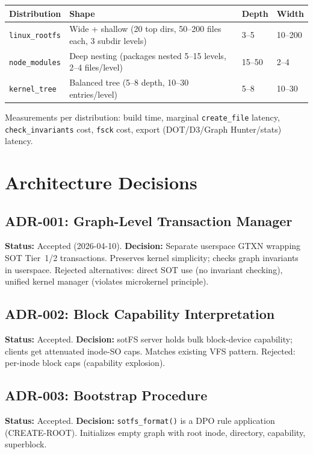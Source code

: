 \documentclass[11pt,a4paper,twoside]{report}
\theoremstyle{definition}
\begin{document}
\begin{center}\small
\begin{tabular}{lp{4cm}ll}
\toprule
\textbf{Distribution} & \textbf{Shape} & \textbf{Depth} & \textbf{Width} \\
\midrule
\texttt{linux\_rootfs}  & Wide + shallow (20 top dirs, 50--200 files each, 3 subdir levels) & 3--5 & 10--200 \\
\texttt{node\_modules}  & Deep nesting (packages nested 5--15 levels, 2--4 files/level) & 15--50 & 2--4 \\
\texttt{kernel\_tree}   & Balanced tree (5--8 depth, 10--30 entries/level) & 5--8 & 10--30 \\
\bottomrule
\end{tabular}
\end{center}

Measurements per distribution: build time, marginal \texttt{create\_file} latency,
\texttt{check\_invariants} cost, \texttt{fsck} cost, export (DOT/D3/Graph Hunter/stats) latency.

\part{Architecture Decisions}

\chapter{ADR-001: Graph-Level Transaction Manager}
\textbf{Status:} Accepted (2026-04-10). \textbf{Decision:} Separate userspace GTXN wrapping SOT Tier~1/2 transactions.  Preserves kernel simplicity; checks graph invariants in userspace.  Rejected alternatives: direct SOT use (no invariant checking), unified kernel manager (violates microkernel principle).

\chapter{ADR-002: Block Capability Interpretation}
\textbf{Status:} Accepted. \textbf{Decision:} sotFS server holds bulk block-device capability; clients get attenuated inode-SO caps.  Matches existing VFS pattern.  Rejected: per-inode block caps (capability explosion).

\chapter{ADR-003: Bootstrap Procedure}
\textbf{Status:} Accepted. \textbf{Decision:} \texttt{sotfs\_format()} is a DPO rule application (CREATE-ROOT).  Initializes empty graph with root inode, directory, capability, superblock.
\end{document}
